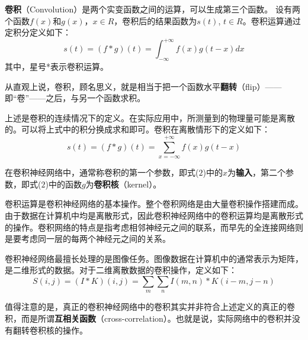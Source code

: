 
\textbf{卷积}（Convolution）是两个实变函数之间的运算，可以生成第三个函数。
设有两个函数$f(x)$和$g(x)$，$x \in R$，卷积后的结果函数为$s(t)$, $t \in R$。卷积运算通过定积分定义如下：
\begin{equation}
s(t) = (f*g)(t) = \int_{ - \infty }^{ + \infty } {f(x)g(t - x)dx}
\end{equation}
其中，星号*表示卷积运算。

从直观上说，卷积，顾名思义，就是相当于把一个函数水平\textbf{翻转}（flip）——即“卷”——之后，与另一个函数求积。

上述是卷积的连续情况下的定义。在实际应用中，所测量到的物理量可能是离散的。可以将上式中的积分换成求和即可。卷积在离散情形下的定义如下：
\begin{equation}
s(t) = (f*g)(t) = \sum_{ x = - \infty }^{ + \infty } {f(x)g(t - x)}
\end{equation}

在卷积神经网络中，通常称卷积的第一个参数，即式($2$)中的$x$为\textbf{输入}，第二个参数，即式($2$)中的函数$g$为\textbf{卷积核}（kernel）。

卷积运算是卷积神经网络的基本操作。整个卷积网络是由大量卷积操作搭建而成。由于数据在计算机中均是离散形式，因此卷积神经网络中的卷积运算均是离散形式的操作。卷积网络的特点是指考虑相邻神经元之间的联系，而早先的全连接网络则是要考虑同一层的每两个神经元之间的关系。

卷积神经网络最擅长处理的是图像任务。图像数据在计算机中的通常表示为矩阵，是二维形式的数据。对于二维离散数据的卷积操作，定义如下：
\begin{equation}
S(i,j) = (I*K)(i,j) = \sum_{m}\sum_{n}I(m,n)*K(i-m,j-n)
\end{equation}

值得注意的是，真正的卷积神经网络中的卷积其实并非符合上述定义的真正的卷积，而是所谓\textbf{互相关函数}（cross-correlation）。也就是说，实际网络中的卷积并没有翻转卷积核的操作\cite{GDL}。